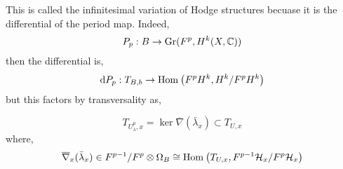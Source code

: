 \documentclass[12pt]{article}
\begin{document}
\begin{rmk}
This is called the infinitesimal variation of Hodge structures becuase it is the differential of the period map. Indeed,
\[ P_p : B \to \mathrm{Gr}(F^p, H^k(X, \mathbb{C})) \]
then the differential is,
\[ \mathrm{d}{P_p} : T_{B,b} \to \mathrm{Hom}_{} \left( F^p H^k, H^k / F^p H^k \right) \]
but this factors by transversality as,
\begin{center}
\end{center}
\end{rmk}

\begin{lemma}
\[ T_{U^p_\lambda, x} = \ker{\overline{\nabla}(\bar{\lambda}_x)} \subset T_{U, x} \]
where,
\[ \overline{\nabla}_x(\bar{\lambda}_x) \in F^{p-1} / F^p \otimes \Omega_B \cong \mathrm{Hom}_{} \left( T_{U,x}, F^{p-1} \mathcal{H}_x / F^p \mathcal{H}_x \right) \]
\end{lemma}
\end{document}

